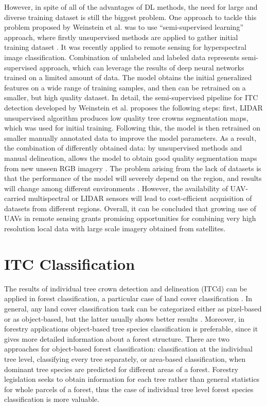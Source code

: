However, in spite of all of the advantages of DL methods, the need for large and diverse training dataset is still the biggest problem. One approach to tackle this problem proposed by Weinstein et al. was to use “semi-supervised learning” approach, where firstly unsupervised methods are applied to gather initial training dataset \cite{Weinstein2019}. It was recently applied to remote sensing for hyperspectral image classification. Combination of unlabeled and labeled data represents semi-supervised approach, which can leverage the results of deep neural networks trained on a limited amount of data. The model obtains the initial generalized features on a wide range of training samples, and then can be retrained on a smaller, but high quality dataset. In detail, the semi-supervised pipeline for \gls{ITC} detection developed by Weinstein et al. proposes the following steps: first, \gls{LIDAR} unsupervised algorithm produces low quality tree crowns segmentation maps, which was used for initial training. Following this, the model is then retrained on smaller manually annotated data to improve the model parameters. As a result, the combination of differently obtained data: by unsupervised methods and manual delineation, allows the model to obtain good quality segmentation maps from new unseen RGB imagery \cite{Weinstein2019}. The problem arising from the lack of datasets is that the performance of the model will severely depend on the region, and results will change among different environments \cite{Weinstein2019}. However, the availability of UAV-carried multispectral or \gls{LIDAR} sensors will lead to cost-efficient acquisition of datasets from different regions. Overall, it can be concluded that growing use of \gls{UAV}s in remote sensing grants promising opportunities for combining very high resolution local data with large scale imagery obtained from satellites.

\section{\gls{ITC} Classification}

The results of individual tree crown detection and delineation (\gls{ITC}d) can be applied in forest classification, a particular case of land cover classification \cite{Mosin2019}. In general, any land cover classification task can be categorized either as pixel-based or as object-based, but the latter usually shows better results \cite{Pouliot2002}. Moreover, in forestry applications object-based tree species classification is preferable, since it gives more detailed information about a forest structure. There are two approaches for object-based forest classification: classification at the individual tree level, classifying every tree separately, or area-based classification, when dominant tree species are predicted for different areas of a forest. Forestry legislation seeks to obtain information for each tree rather than general statistics for whole parcels of a forest, thus the case of individual tree level forest species classification is more valuable. 